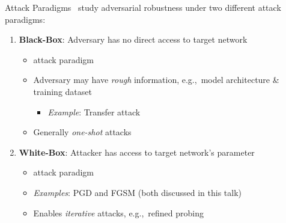 \begin{frame}{Attack Paradigms}
  \madry\ study adversarial robustness under two different attack paradigms:
  \vfill
  \begin{enumerate}[<+->]
    \item \textbf{Black-Box}: Adversary has no direct access to target network
      \begin{itemize}[<+->]
        \setlength\itemsep{6pt}
        \item {} attack paradigm
        \item Adversary may have \textit{rough} information, e.g.,~model architecture \& training dataset
          \begin{itemize}
            \item \textit{Example}: Transfer attack
          \end{itemize}
        \item Generally \textit{one-shot} attacks
      \end{itemize}
    \vfill
    \item \textbf{White-Box}: Attacker has access to target network's parameter
      \begin{itemize}
        \setlength\itemsep{6pt}
        \item {} attack paradigm
        \item \textit{Examples}: PGD and FGSM (both discussed in this talk)
        \item Enables \textit{iterative} attacks, e.g.,~refined probing
      \end{itemize}
  \end{enumerate}
\end{frame}

